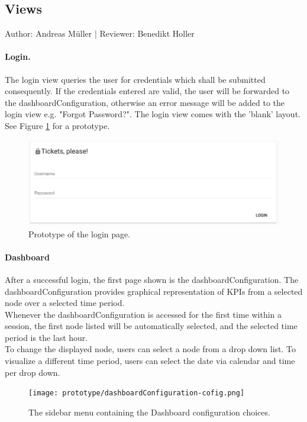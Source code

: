 \documentclass{scrreprt}
\begin{document}
\subsection{Views}
Author:  Andreas M\"uller | Reviewer: Benedikt Holler\\
\paragraph{Login.} The login view queries the user for credentials which shall be submitted
consequently. If the credentials entered are valid, the user will be forwarded to the dashboardConfiguration,
otherwise an error message will be added to the login view e.g. "Forgot Password?". The login view comes with the 'blank'
layout. See Figure \ref{login} for a prototype.
\begin{figure}[h]
  \centering
  \includegraphics[width=.7\linewidth]{prototype/login}
  \caption{Prototype of the login page.}
  \label{login}
\end{figure}
\paragraph{Dashboard}
After a successful login, the first page shown is the dashboardConfiguration.
The dashboardConfiguration provides graphical representation of KPIs from a selected node over a selected time period. \\
Whenever the dashboardConfiguration is accessed for the first time within a session, the first node listed will be automatically selected, and the selected time period is the last hour. \\
To change the displayed node, users can select a node from a drop down list.
To visualize a different time period, users can select the date via calendar and time per drop down.
\begin{figure}[!h]
  \centering
  \texttt{[image: prototype/dashboardConfiguration-cofig.png]}
  \caption{The sidebar menu containing the Dashboard configuration choices.}
  \label{dbc}
\end{figure}
\end{document}
